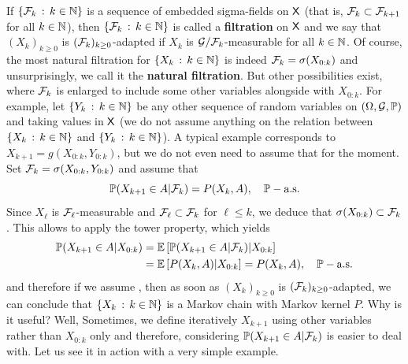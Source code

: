 \documentclass[english,graybox,envcountchap,envcountsame,sectrefs,shortlabels]{svmono}
\theoremstyle{style}
\begin{document}
If $\left\{ \mathcal{F}_{k}\,:\,k\in\mathbb{N}\right\}$
is a sequence of embedded sigma-fields on $\mathsf{X}$ (that is, $\mathcal{F}_{k}\subset\mathcal{F}_{k+1}$
for all $k\in\mathbb{N}$), then $\left\{ \mathcal{F}_{k}\,:\,k\in\mathbb{N}\right\}$ is called a \textbf{filtration} 
on $\mathsf{X}$ and we say that $(X_{k})_{k\geq0}$ is $(\mathcal{F}_{k})_{k\geq0}$-adapted
if $X_{k}$ is $\mathcal{G}/\mathcal{F}_{k}$-measurable for all $k\in\mathbb{N}$. Of
course, the most natural filtration for $\left\{ X_{k}\,:\,k\in\mathbb{N}\right\}$
is indeed $\mathcal{F}_{k}=\sigma(X_{0:k})$ and unsurprisingly, we call
it the \textbf{natural filtration}. But other possibilities exist,
where $\mathcal{F}_{k}$ is enlarged to include some other variables alongside
with $X_{0:k}$. For example, let $\left\{ Y_{k}\,:\,k\in\mathbb{N}\right\}$ be any
other sequence of random variables on $(\Omega,\mathcal{G},\mathbb{P})$ and taking
values in $\mathsf{X}$ (we do not assume anything on the relation between  $\left\{ X_{k}\,:\,k\in\mathbb{N}\right\}$ and $\left\{ Y_{k}\,:\,k\in\mathbb{N}\right\}$). A typical example corresponds
to $X_{k+1}=g(X_{0:k},Y_{0:k})$, but we do not even need to assume
that for the moment. Set $\mathcal{F}_{k}=\sigma(X_{0:k},Y_{0:k})$ and assume
that
\begin{equation}
\mathbb{P}(X_{k+1}\in A|\mathcal{F}_{k})=P(X_{k},A),\quad\mathbb{P}-\mbox{a.s.}\label{eq:def:MC:F-k}
\end{equation}
Since $X_{\ell}$ is $\mathcal{F}_{\ell}$-measurable and $\mathcal{F}_{\ell}\subset\mathcal{F}_{k}$
for $\ell\leq k$, we deduce that $\sigma(X_{0:k})\subset\mathcal{F}_{k}$.
This allows to apply the tower property, which yields
\begin{align*}
\mathbb{P}(X_{k+1}\in A|X_{0:k}) & =\mathbb{E}\left[\mathbb{P}(X_{k+1}\in A|\mathcal{F}_{k})|X_{0:k}\right]\\
 & =\mathbb{E}\left[P(X_{k},A)|X_{0:k}\right]=P(X_{k},A),\quad\mathbb{P}-\mbox{a.s.}
\end{align*}
and therefore if we assume , then as soon as $(X_{k})_{k\geq0}$
is $(\mathcal{F}_{k})_{k\geq0}$-adapted, we can conclude that $\left\{ X_{k}\,:\,k\in\mathbb{N}\right\}$
is a Markov chain with Markov kernel $P$. Why is it useful? Well,
Sometimes, we define iteratively $X_{k+1}$ using other variables
rather than $X_{0:k}$ only and therefore, considering $\mathbb{P}(X_{k+1}\in A|\mathcal{F}_{k})$
is easier to deal with. Let us see it in action with a very simple
example.
\end{document}
